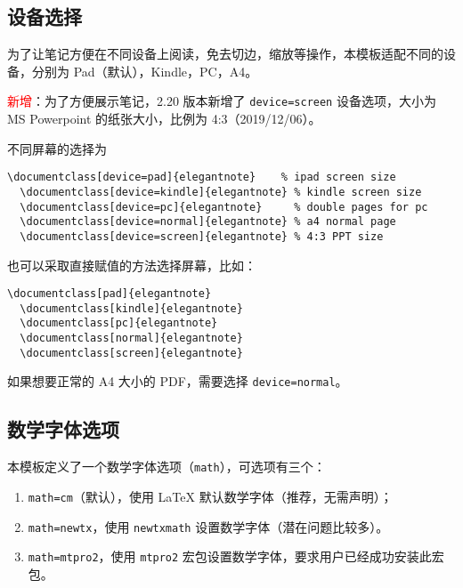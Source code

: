 \documentclass[cn,geye,blue,14pt,normal]{elegantnote}
\begin{document}
\subsection{设备选择}

为了让笔记方便在不同设备上阅读，免去切边，缩放等操作，本模板适配不同的设备，分别为 Pad（默认），Kindle，PC，A4。

\textcolor{red}{\kaishu 新增}：为了方便展示笔记，2.20 版本新增了 \lstinline{device=screen} 设备选项，大小为 MS Powerpoint 的纸张大小，比例为 4:3（2019/12/06）。

不同屏幕的选择为
\begin{lstlisting}[frame=none]  
  \documentclass[device=pad]{elegantnote}    % ipad screen size
  \documentclass[device=kindle]{elegantnote} % kindle screen size
  \documentclass[device=pc]{elegantnote}     % double pages for pc 
  \documentclass[device=normal]{elegantnote} % a4 normal page
  \documentclass[device=screen]{elegantnote} % 4:3 PPT size
\end{lstlisting}
\begin{note}
  也可以采取直接赋值的方法选择屏幕，比如：
\end{note}
\begin{lstlisting}[frame=none]  
  \documentclass[pad]{elegantnote}
  \documentclass[kindle]{elegantnote}
  \documentclass[pc]{elegantnote}
  \documentclass[normal]{elegantnote}
  \documentclass[screen]{elegantnote}
\end{lstlisting}

\begin{note}
  如果想要正常的 A4 大小的 PDF，需要选择 \lstinline{device=normal}。
\end{note}


\subsection{数学字体选项}

本模板定义了一个数学字体选项（\lstinline{math}），可选项有三个：
\begin{enumerate}
  \item \lstinline{math=cm}（默认），使用 \LaTeX{} 默认数学字体（推荐，无需声明）；
  \item \lstinline{math=newtx}，使用 \lstinline{newtxmath} 设置数学字体（潜在问题比较多）。
  \item \lstinline{math=mtpro2}，使用 \lstinline{mtpro2} 宏包设置数学字体，要求用户已经成功安装此宏包。
\end{enumerate}
\end{document}
